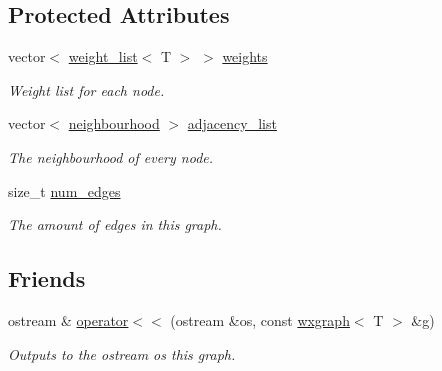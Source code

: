 \subsection*{Protected Attributes}
\begin{DoxyCompactItemize}
\item 
vector$<$ \hyperlink{namespacelgraph_1_1utils_a11e7963f3637ea13778b8d3e69d2c17f}{weight\+\_\+list}$<$ T $>$ $>$ \hyperlink{classlgraph_1_1utils_1_1wxgraph_a15569c8c0fccb641709dc81eb0e29c94}{weights}
\begin{DoxyCompactList}\small\item\em Weight list for each node. \end{DoxyCompactList}\item 
vector$<$ \hyperlink{namespacelgraph_1_1utils_a0f2ef47028a466d26841709e705390ac}{neighbourhood} $>$ \hyperlink{classlgraph_1_1utils_1_1xxgraph_a1d5fda0d5aa89340f997428b982f966f}{adjacency\+\_\+list}\hypertarget{classlgraph_1_1utils_1_1xxgraph_a1d5fda0d5aa89340f997428b982f966f}{}\label{classlgraph_1_1utils_1_1xxgraph_a1d5fda0d5aa89340f997428b982f966f}

\begin{DoxyCompactList}\small\item\em The neighbourhood of every node. \end{DoxyCompactList}\item 
size\+\_\+t \hyperlink{classlgraph_1_1utils_1_1xxgraph_a217ebb1cd8946fedfbf94a9b22f7da48}{num\+\_\+edges}\hypertarget{classlgraph_1_1utils_1_1xxgraph_a217ebb1cd8946fedfbf94a9b22f7da48}{}\label{classlgraph_1_1utils_1_1xxgraph_a217ebb1cd8946fedfbf94a9b22f7da48}

\begin{DoxyCompactList}\small\item\em The amount of edges in this graph. \end{DoxyCompactList}\end{DoxyCompactItemize}
\subsection*{Friends}
\begin{DoxyCompactItemize}
\item 
ostream \& \hyperlink{classlgraph_1_1utils_1_1wxgraph_acd581d8cf39c384e6476c3fe2d419e3e}{operator$<$$<$} (ostream \&os, const \hyperlink{classlgraph_1_1utils_1_1wxgraph}{wxgraph}$<$ T $>$ \&g)
\begin{DoxyCompactList}\small\item\em Outputs to the ostream {\itshape os} this graph. \end{DoxyCompactList}\end{DoxyCompactItemize}


